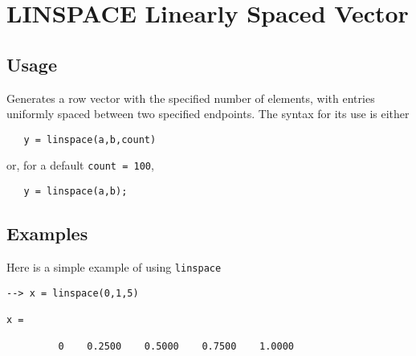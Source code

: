 \section{LINSPACE Linearly Spaced Vector}

\subsection{Usage}

Generates a row vector with the specified number of elements, with
entries uniformly spaced between two specified endpoints.  The syntax
for its use is either
\begin{verbatim}
   y = linspace(a,b,count)
\end{verbatim}
or, for a default \verb|count = 100|,
\begin{verbatim}
   y = linspace(a,b);
\end{verbatim}
\subsection{Examples}

Here is a simple example of using \verb|linspace|
\begin{verbatim}
--> x = linspace(0,1,5)

x = 

         0    0.2500    0.5000    0.7500    1.0000 
\end{verbatim}

